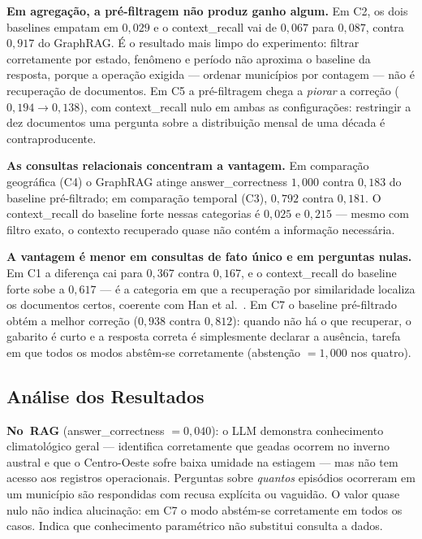 \documentclass[conference]{IEEEtran}
\begin{document}
\textbf{Em agregação, a pré-filtragem não produz ganho algum.} Em C2, os dois
baselines empatam em $0{,}029$ e o context\_recall vai de $0{,}067$ para
$0{,}087$, contra $0{,}917$ do GraphRAG. É o resultado mais limpo do
experimento: filtrar corretamente por estado, fenômeno e período não aproxima o
baseline da resposta, porque a operação exigida --- ordenar municípios por
contagem --- não é recuperação de documentos. Em C5 a pré-filtragem chega a
\emph{piorar} a correção ($0{,}194 \rightarrow 0{,}138$), com context\_recall
nulo em ambas as configurações: restringir a dez documentos uma pergunta sobre a
distribuição mensal de uma década é contraproducente.

\textbf{As consultas relacionais concentram a vantagem.} Em comparação
geográfica (C4) o GraphRAG atinge answer\_correctness $1{,}000$ contra
$0{,}183$ do baseline pré-filtrado; em comparação temporal (C3), $0{,}792$
contra $0{,}181$. O context\_recall do baseline forte nessas categorias é
$0{,}025$ e $0{,}215$ --- mesmo com filtro exato, o contexto recuperado quase
não contém a informação necessária.

\textbf{A vantagem é menor em consultas de fato único e em perguntas nulas.}
Em C1 a diferença cai para $0{,}367$ contra $0{,}167$, e o context\_recall do
baseline forte sobe a $0{,}617$ --- é a categoria em que a recuperação por
similaridade localiza os documentos certos, coerente com
Han et al.~\cite{han2025ragvsgraphrag}. Em C7 o baseline pré-filtrado obtém a
melhor correção ($0{,}938$ contra $0{,}812$): quando não há o que recuperar, o
gabarito é curto e a resposta correta é simplesmente declarar a ausência, tarefa
em que todos os modos abstêm-se corretamente (abstenção $=1{,}000$ nos quatro).

\subsection{Análise dos Resultados}

\textbf{No~RAG} (answer\_correctness $=0{,}040$): o LLM demonstra conhecimento
climatológico geral --- identifica corretamente que geadas ocorrem no inverno
austral e que o Centro-Oeste sofre baixa umidade na estiagem --- mas não tem
acesso aos registros operacionais. Perguntas sobre \emph{quantos} episódios
ocorreram em um município são respondidas com recusa explícita ou vaguidão. O
valor quase nulo não indica alucinação: em C7 o modo abstém-se corretamente em
todos os casos. Indica que conhecimento paramétrico não substitui consulta a
dados.
\end{document}
